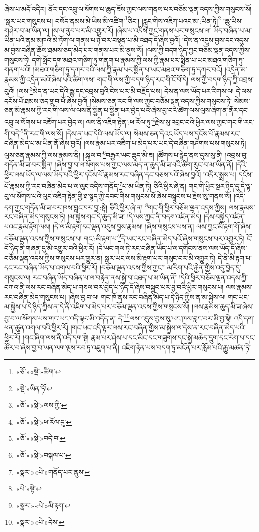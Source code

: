 ཞེས་པ་མདོ་འདིར། ནོར་དང་འབྲུ་ལ་སོགས་པ་ཆུད་ཟོས་ཀྱང་ལས་གནས་པར་བཅོམ་ལྡན་འདས་ཀྱིས་གསུངས་སོ། །སླར་ཡང་གསུངས་པ། བསོད་ནམས་མེ་ཡིས་མི་འཚིག་\footnote{«ཅོ་»«སྡེ་»ཚིག་}ཅིང་། །རླུང་གིས་འཇིག་པའང་མ་:ཡིན་ཏེ།\footnote{«སྡེ་»ཡིན་ཏོ།} །ཆུ་ཡིས་གཤེར་བ་མ་ཡིན་ལ། །ས་ལ་ནུབ་པར་མི་འགྱུར་རོ། །ཞེས་པ་འདིས་ཀྱང་གནས་པར་གསུངས་ལ། ཡོད་བཞིན་པ་མ་ཡིན་པའི་ནམ་མཁའི་མེ་ཏོག་ལ་གནས་པ་ཉེ་བར་བསྟན་པ་མི་འཐད་དོ་ཞེས་བྱའོ། །དེས་ན་འདུས་བྱས་དང་འདུས་མ་བྱས་བཞིན་ཆོས་ཐམས་ཅད་མེད་པར་གནས་པར་མི་ནུས་སོ། །ལས་ཀྱི་བདག་ཉིད་ཀྱང་བཅོམ་ལྡན་འདས་ཀྱིས་གསུངས་ཏེ། དགེ་སློང་དག་མཐའ་གཅིག་ཏུ་གནག་པ་རྣམས་ཀྱི་ལས་ཀྱི་རྣམ་པར་སྨིན་པ་ཡང་མཐའ་གཅིག་ཏུ་གནག་པའོ། །མཐའ་གཅིག་ཏུ་དཀར་བའི་ལས་ཀྱི་རྣམ་པར་སྨིན་པ་ཡང་མཐའ་གཅིག་ཏུ་དཀར་བའོ། །འདྲེན་མ་རྣམས་ཀྱི་འདྲེན་མའོ་ཞེས་པའི་ཚིག་ལས། གང་གི་ལས་ཀྱི་བདག་ཉིད་རང་གི་ངོ་བོ་དེ། ལས་ཀྱི་བདག་ཉིད་ཀྱི་འབྲས་བུའོ། །ལས་\footnote{«ཅོ་»«སྡེ་»ལས་ཀྱི་}མེད་ན་ཡང་དེའི་རྒྱུ་དང་འབྲས་བུའི་ངེས་པར་མི་བརྗོད་པས། དེས་ན་ལས་ཡོད་པར་རིགས་ལ། དེ་ལས་དངོས་པོ་ཐམས་ཅད་གྲུབ་པོ་ཞེས་བྱའོ། །སེམས་ཅན་རང་གི་ལས་ཀྱང་བཅོམ་ལྡན་འདས་ཀྱིས་གསུངས་ཏེ། སེམས་ཅན་མི་རྣམས་ཀྱི་རང་གི་ལས་ལ་ལས་ནི་སྦྱིན་པ་སྦྱིན་པར་བྱེད་པའོ་ཞེས་བྱ་བའི་ཚིག་ལས་ལུས་ཞིག་ན་ནོར་དང་འབྲུ་ལ་སོགས་པ་འཇོག་པར་བྱེད་ལ། ལས་ནི་འཇིག་རྟེན་:ཕ་རོལ་ཏུ་\footnote{«ཅོ་»«སྡེ་»ཕ་རོལ་དུ་}རྗེས་སུ་འབྲང་བའི་ཕྱིར་ལས་ཀྱང་གང་གི་རང་གི་བདེ་\footnote{«ཅོ་»«སྡེ་»བདེ་བ་}ནི་རང་གི་ལས་སོ། །དེས་ན་ཡང་དེའི་ལས་ཡོད་ལ། སེམས་ཅན་དེའང་ཡོད་པས་དངོས་པོ་རྣམས་རང་བཞིན་མེད་པ་མ་ཡིན་ནོ་ཞེས་བྱའོ། །ལས་རྣམ་པར་འཇིག་པ་མེད་པར་ཡང་དེ་བཞིན་གཤེགས་པས་གསུངས་ཏེ། ལུས་ཅན་རྣམས་ཀྱི་ལས་རྣམས་ནི། །:སྐལ་བ་\footnote{«ཅོ་»«སྡེ་»བསྐལ་པ་}བརྒྱར་ཡང་ཆུད་མི་ཟ། །ཚོགས་པ་རྙེད་ནས་དུས་སུ་ནི། །འབྲས་བུ་གདོན་མི་ཟ་བར་སྨིན། །ཞེས་བྱ་བ་ལ་སོགས་པས་ཀྱང་ལས་མེད་ན་ཆུད་མི་ཟ་བའི་ཚིག་རུང་བ་མ་ཡིན་ནོ། །དེའི་ཕྱིར་ལས་ཡོད་ལ་ལས་ཡོད་པའི་ཕྱིར་དངོས་པོ་རྣམས་རང་བཞིན་དང་བཅས་པའོ་ཞེས་བྱའོ། །འདིར་སྨྲས་པ། དངོས་པོ་རྣམས་ཀྱི་རང་བཞིན་མེད་པ་ལ་ལུང་འདིས་གནོད་\footnote{«སྣར་»«པེ་»གནོད་པར་ནུས་}པ་མ་ཡིན་ཏེ། ཅིའི་ཕྱིར་ཞེ་ན། གང་གི་ཕྱིར་སྔར་ཉིད་དུ་དེ་ལྟ་བུ་ལ་སོགས་པའི་ལུང་འཇིག་རྟེན་གྱི་ཐ་སྙད་ཀྱི་དབང་གིས་གསུངས་སོ་ཞེས་བསྒྲུབས་པ་རྗེས་སུ་གནས་སོ། །འདི་དག་ཀྱང་གདོན་མི་ཟ་བར་ཁས་བླང་བར་བྱ་:སྟེ། ཅིའི་ཕྱིར་ཞེ་ན། \footnote{«པེ་»སྟེ།  }གང་གི་ཕྱིར་བཅོམ་ལྡན་འདས་ཀྱིས། ལས་རྣམས་རང་བཞིན་མེད་གསུངས་ཏེ། །མ་སྐྱེས་གང་དེ་ཆུད་མི་ཟ། །དེ་ལས་ཀྱང་ནི་བདག་འཛིན་མེད། །དེས་བསྐྱེད་འཛིན་པའང་རྣམ་རྟོག་ལས། །དེ་ལ་མི་རྟག་དང་ལྡན་འདུས་བྱས་རྣམས། །ཞེས་གསུངས་པས་ན། ལས་ཀྱང་མི་རྟག་གོ་ཞེས་བཅོམ་ལྡན་འདས་ཀྱིས་གསུངས་པ། གང་:མི་རྟག་པ་\footnote{«སྣར་»«པེ་»མི་རྟག་}དེ་ཡང་རང་བཞིན་མེད་པའོ་ཞེས་གསུངས་པར་འགྱུར་ཏེ། ངོ་བོ་ཉིད་ནི་གཞན་དུ་མི་འགྱུར་བའི་ཕྱིར་རོ། །དེ་ཡང་གལ་ཏེ་རང་བཞིན་ཡོད་པ་ལ་དགོངས་ནས་ལས་ཡོད་དོ་ཞེས་བཅོམ་ལྡན་འདས་ཀྱིས་གསུངས་པར་གྱུར་ན། སླར་ཡང་ལས་མི་རྟག་པར་གསུང་བར་མི་འགྱུར་ཏེ། དེ་ནི་མི་རྟག་པ་དང་རང་བཞིན་ཡོད་པ་འགལ་བའི་ཕྱིར་རོ། །བཅོམ་ལྡན་འདས་ཀྱིས་ཀྱང་། མ་རིག་པའི་རྐྱེན་གྱིས་འདུ་བྱེད་དུ་གསུངས་ལ། རང་བཞིན་ཡོད་བཞིན་པ་ལ་བརྟེན་ནས་སྐྱེ་བ་འཐད་པ་མ་ཡིན་ནོ། །དེའི་ཕྱིར་བཅོམ་ལྡན་འདས་ཀྱི་བཀའ་ནི་ལས་རང་བཞིན་མེད་པ་གསལ་བར་བྱེད་པ་ཉིད་དོ་ཞེས་བསྒྲུབ་པར་བྱ་བའི་ཕྱིར་གསུངས་པ། ལས་རྣམས་རང་བཞིན་མེད་གསུངས་པ། །ཞེས་བྱ་བ་ལ། གང་ཁོ་ནས་རང་བཞིན་མེད་པ་དེ་ཉིད་ཀྱིས་ན་མ་སྐྱེས་ལ། གང་ཡང་མ་སྐྱེས་པ་དེ་ཉིད་ཀྱིས་ན་དེ་ནི་འཇིག་པ་མེད་པར་བཅོམ་ལྡན་འདས་ཀྱིས་གསུངས་སོ། །ལས་རྣམས་ཆུད་མི་ཟ་ཞེས་བྱ་བ་ལ་སོགས་པས་གང་ཡང་འདི་ལྟར་མི་འདོད་ན། དེ་\footnote{«སྣར་»«པེ་»དེས་}ལས་འདུས་བྱས་སུ་ཡང་ཁས་བླང་བར་མི་བྱ་སྟེ། འདི་དག་ཕན་ཚུན་འགལ་བའི་ཕྱིར་རོ། །གང་ཡང་འདི་ལྟར་ལས་རང་བཞིན་གྱིས་མ་སྐྱེས་ལ་དེས་ན་རང་བཞིན་མེད་པའི་ཕྱིར་རོ། །གང་ཞིག་ལས་ནི་འདི་དག་སྟེ། རྣམ་པར་ཤེས་པ་དང་མིང་དང་གཟུགས་དང་སྐྱེ་མཆེད་དྲུག་དང་རེག་པ་དང་ཚོར་བ་ཞེས་བྱ་བ་ཡན་ལག་ལྔས་རབ་ཏུ་འཇུག་པ་ནི། འཇིག་རྟེན་པས་བདག་ཏུ་མངོན་པར་རློམ་པའི་རྒྱུ་མཚན་ཏེ། 